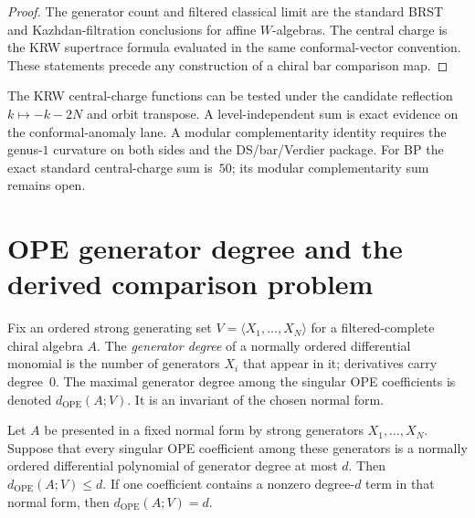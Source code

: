 \begin{proof}
The generator count and filtered classical limit are the standard BRST and
Kazhdan-filtration conclusions for affine $W$-algebras.  The central charge is
the KRW supertrace formula evaluated in the same conformal-vector convention.
These statements precede any construction of a chiral bar comparison map.
\end{proof}

\begin{remark}
\label{rem:hook-kappa-sum-rule}
The KRW central-charge functions can be tested under the candidate reflection
$k\mapsto-k-2N$ and orbit transpose.  A level-independent sum is exact
evidence on the conformal-anomaly lane.  A modular complementarity identity
requires the genus-$1$ curvature on both sides and the DS/bar/Verdier package.
For BP the exact standard central-charge sum is~$50$; its modular
complementarity sum remains open.
\end{remark}

\section{OPE generator degree and the derived comparison problem}

\begin{definition}
Fix an ordered strong generating set $V=\langle X_1,\dots,X_N\rangle$ for a
filtered-complete chiral algebra $A$. The \emph{generator degree} of a
normally ordered differential monomial is the number of generators $X_i$ that
appear in it; derivatives carry degree~$0$.  The maximal generator
degree among the singular OPE coefficients is denoted
$d_{\mathrm{OPE}}(A;V)$.  It is an invariant of the chosen normal form.
\end{definition}

\begin{theorem}
\label{thm:canonical-degree-detection}
Let $A$ be presented in a fixed normal form by strong generators
$X_1,\dots,X_N$. Suppose that every singular OPE coefficient among these
generators is a normally ordered differential polynomial of generator degree at
most $d$. Then $d_{\mathrm{OPE}}(A;V)\le d$.  If one coefficient contains a
nonzero degree-$d$ term in that normal form, then
$d_{\mathrm{OPE}}(A;V)=d$.
\end{theorem}

